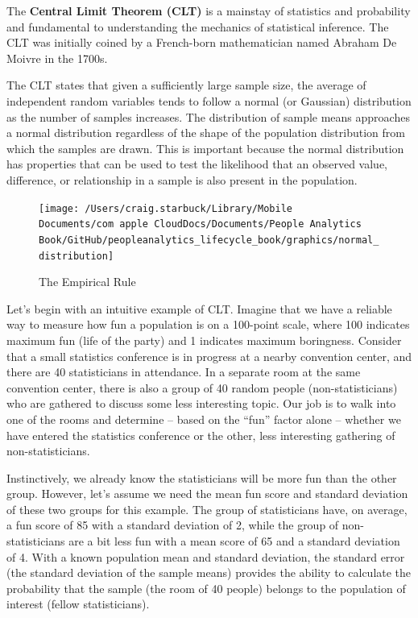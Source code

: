 \documentclass[
]{book}
\begin{document}
The \textbf{Central Limit Theorem (CLT)} is a mainstay of statistics and probability and fundamental to understanding the mechanics of statistical inference. The CLT was initially coined by a French-born mathematician named Abraham De Moivre in the 1700s.

The CLT states that given a sufficiently large sample size, the average of independent random variables tends to follow a normal (or Gaussian) distribution as the number of samples increases. The distribution of sample means approaches a normal distribution regardless of the shape of the population distribution from which the samples are drawn. This is important because the normal distribution has properties that can be used to test the likelihood that an observed value, difference, or relationship in a sample is also present in the population.

\begin{figure}

{\centering \texttt{[image: /Users/craig.starbuck/Library/Mobile Documents/com~apple~CloudDocs/Documents/People Analytics Book/GitHub/peopleanalytics\_lifecycle\_book/graphics/normal\_distribution]} 

}

\caption{The Empirical Rule}\label{fig:emp-rule}
\end{figure}

Let's begin with an intuitive example of CLT. Imagine that we have a reliable way to measure how fun a population is on a 100-point scale, where 100 indicates maximum fun (life of the party) and 1 indicates maximum boringness. Consider that a small statistics conference is in progress at a nearby convention center, and there are 40 statisticians in attendance. In a separate room at the same convention center, there is also a group of 40 random people (non-statisticians) who are gathered to discuss some less interesting topic. Our job is to walk into one of the rooms and determine -- based on the ``fun'' factor alone -- whether we have entered the statistics conference or the other, less interesting gathering of non-statisticians.

Instinctively, we already know the statisticians will be more fun than the other group. However, let's assume we need the mean fun score and standard deviation of these two groups for this example. The group of statisticians have, on average, a fun score of 85 with a standard deviation of 2, while the group of non-statisticians are a bit less fun with a mean score of 65 and a standard deviation of 4. With a known population mean and standard deviation, the standard error (the standard deviation of the sample means) provides the ability to calculate the probability that the sample (the room of 40 people) belongs to the population of interest (fellow statisticians).
\end{document}
